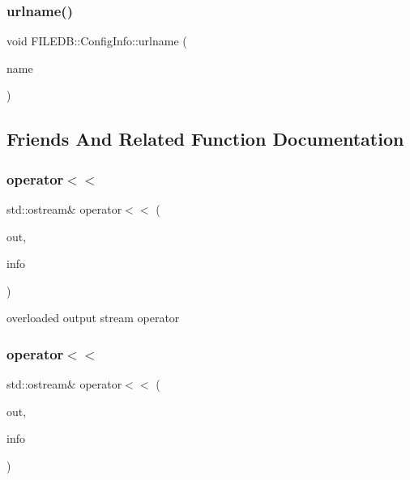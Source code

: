 \subsubsection{\texorpdfstring{urlname()}{urlname()}\hspace{0.1cm}{\footnotesize\ttfamily [4/4]}}
{\footnotesize\ttfamily void F\+I\+L\+E\+D\+B\+::\+Config\+Info\+::urlname (\begin{DoxyParamCaption}\item[{const std\+::string \&}]{name }\end{DoxyParamCaption})}



\subsection{Friends And Related Function Documentation}
\mbox{\label{classFILEDB_1_1ConfigInfo_a2aa453414301c12055ae76f2bfdc8f87}} 
\subsubsection{\texorpdfstring{operator$<$$<$}{operator<<}\hspace{0.1cm}{\footnotesize\ttfamily [1/2]}}
{\footnotesize\ttfamily std\+::ostream\& operator$<$$<$ (\begin{DoxyParamCaption}\item[{std\+::ostream \&}]{out,  }\item[{const \mbox{\hyperlink{classFILEDB_1_1ConfigInfo}{Config\+Info}} \&}]{info }\end{DoxyParamCaption})\hspace{0.3cm}{\ttfamily [friend]}}

overloaded output stream operator \mbox{\label{classFILEDB_1_1ConfigInfo_a2aa453414301c12055ae76f2bfdc8f87}} 
\subsubsection{\texorpdfstring{operator$<$$<$}{operator<<}\hspace{0.1cm}{\footnotesize\ttfamily [2/2]}}
{\footnotesize\ttfamily std\+::ostream\& operator$<$$<$ (\begin{DoxyParamCaption}\item[{std\+::ostream \&}]{out,  }\item[{const \mbox{\hyperlink{classFILEDB_1_1ConfigInfo}{Config\+Info}} \&}]{info }\end{DoxyParamCaption})\hspace{0.3cm}{\ttfamily [friend]}}

